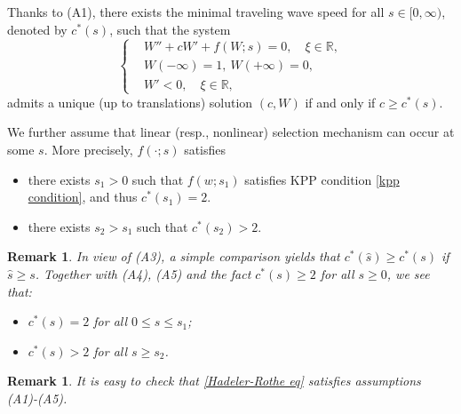 \documentclass[11pt,a4paper]{article}
\newtheorem{remark}[theorem]{\textbf{Remark}}
\numberwithin{equation}{section}
\numberwithin{figure}{section}
\begin{document}

Thanks to (A1), there exists the minimal traveling wave speed for all $s\in[0,\infty)$, denoted by $c^*(s)$, such that
the system
\begin{equation}\label{scalar tw-parameter s}
\left\{
\begin{aligned}
&W''+cW'+f(W;s)=0,\quad  \xi\in\mathbb{R},\\
&W(-\infty)=1,\ W(+\infty)=0,\\
&W'<0,\quad \xi\in\mathbb{R},
\end{aligned}
\right.
\end{equation}
admits a unique (up to translations) solution $(c,W)$ if and only if  $c\geq c^*(s)$.

We further assume that linear (resp., nonlinear) selection mechanism can occur at some $s$.
More precisely, $f(\cdot;s)$ satisfies %
\begin{itemize}
    \item[(A4)] there exists $s_1>0$ such that $f(w;s_1)$ satisfies KPP condition \eqref{kpp condition},
   and thus $c^*(s_1)=2$.
    \item[(A5)]  there exists  %
     $s_2>s_1$ such that $c^*(s_2)>2$.
\end{itemize}

\begin{remark}\label{rk:a4+a5}
In view of (A3), a simple comparison yields that $c^*(\hat{s})\geq c^*(s)$ if $\hat{s}\geq s$.
Together with (A4), (A5) and the fact $c^*(s)\geq 2$ for all $s\geq0$, we see that:
\begin{itemize}
\item[(1)] $c^*(s)=2$ for all $0\leq s\leq s_1$;
\item[(2)] $c^*(s)>2$ for all $s\geq s_2$.
\end{itemize}
\end{remark}


\begin{remark}
It is easy to check that \eqref{Hadeler-Rothe eq} satisfies assumptions  (A1)-(A5).
\end{remark}
\end{document}
